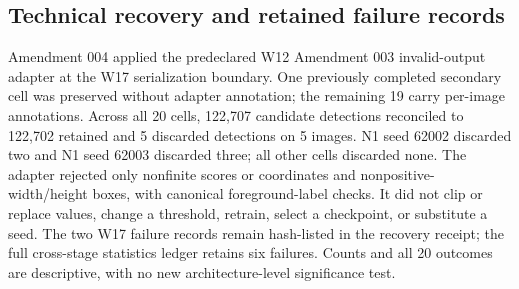 \subsection{Technical recovery and retained failure records}
Amendment 004 applied the predeclared W12 Amendment 003 invalid-output adapter at the W17 serialization boundary. One previously completed secondary cell was preserved without adapter annotation; the remaining 19 carry per-image annotations. Across all 20 cells, 122,707 candidate detections reconciled to 122,702 retained and 5 discarded detections on 5 images. N1 seed 62002 discarded two and N1 seed 62003 discarded three; all other cells discarded none. The adapter rejected only nonfinite scores or coordinates and nonpositive-width/height boxes, with canonical foreground-label checks. It did not clip or replace values, change a threshold, retrain, select a checkpoint, or substitute a seed. The two W17 failure records remain hash-listed in the recovery receipt; the full cross-stage statistics ledger retains six failures. Counts and all 20 outcomes are descriptive, with no new architecture-level significance test.
